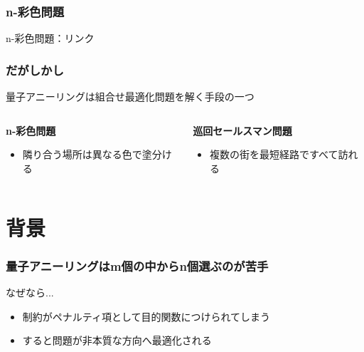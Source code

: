 \begin{frame}
  \frametitle{n-彩色問題}
  n-彩色問題：リンク\\
\end{frame}


\begin{frame}
  \frametitle{だがしかし}

  {\Large  量子アニーリングは組合せ最適化問題を解く手段の一つ}
  \vspace{5mm}

  \begin{columns}
    \begin{column}{0.45\textwidth}
      \textbf{n-彩色問題}
      \begin{itemize}
          \item 隣り合う場所は異なる色で塗分ける
      \end{itemize}
    \end{column}

    \begin{column}{0.45\textwidth}
      \textbf{巡回セールスマン問題}
      \begin{itemize}
          \item 複数の街を最短経路ですべて訪れる
      \end{itemize}
    \end{column}
  \end{columns}
  \vspace{10mm}
\end{frame}

\section{背景}
\begin{frame}
  \frametitle{量子アニーリングはm個の中からn個選ぶのが苦手}
  
  なぜなら...\\
  \begin{itemize}
    \item 制約がペナルティ項として目的関数につけられてしまう
    \item すると問題が非本質な方向へ最適化される
  \end{itemize}

  \vspace{5mm}



\end{frame}

